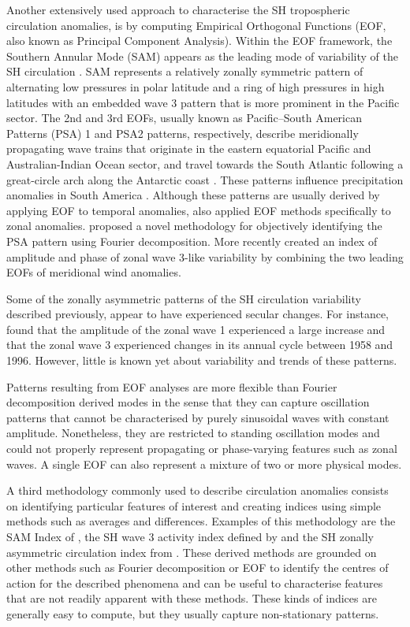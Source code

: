 \documentclass[pdflatex,sn-basic]{sn-jnl}
\theoremstyle{thmstyleone}%
\theoremstyle{thmstyletwo}%
\theoremstyle{thmstylethree}%
\begin{document}
Another extensively used approach to characterise the SH tropospheric circulation anomalies, is by computing Empirical Orthogonal Functions (EOF, also known as Principal Component Analysis).
Within the EOF framework, the Southern Annular Mode (SAM) appears as the leading mode of variability of the SH circulation \citep{fogt2020}.
SAM represents a relatively zonally symmetric pattern of alternating low pressures in polar latitude and a ring of high pressures in high latitudes with an embedded wave 3 pattern that is more prominent in the Pacific sector.
The 2nd and 3rd EOFs, usually known as Pacific--South American Patterns (PSA) 1 and PSA2 patterns, respectively, describe meridionally propagating wave trains that originate in the eastern equatorial Pacific and Australian-Indian Ocean sector, and travel towards the South Atlantic following a great-circle arch along the Antarctic coast \citep{mo2001}.
These patterns influence precipitation anomalies in South America \citep{mo2001}.
Although these patterns are usually derived by applying EOF to temporal anomalies, \citet{raphael2003} also applied EOF methods specifically to zonal anomalies.
\citet{irving2016} proposed a novel methodology for objectively identifying the PSA pattern using Fourier decomposition.
More recently \citet{goyal2022} created an index of amplitude and phase of zonal wave 3-like variability by combining the two leading EOFs of meridional wind anomalies.

Some of the zonally asymmetric patterns of the SH circulation variability described previously, appear to have experienced secular changes.
For instance, \citet{raphael2003} found that the amplitude of the zonal wave 1 experienced a large increase and that the zonal wave 3 experienced changes in its annual cycle between 1958 and 1996.
However, little is known yet about variability and trends of these patterns.

Patterns resulting from EOF analyses are more flexible than Fourier decomposition derived modes in the sense that they can capture oscillation patterns that cannot be characterised by purely sinusoidal waves with constant amplitude.
Nonetheless, they are restricted to standing oscillation modes and could not properly represent propagating or phase-varying features such as zonal waves.
A single EOF can also represent a mixture of two or more physical modes.

A third methodology commonly used to describe circulation anomalies consists on identifying particular features of interest and creating indices using simple methods such as averages and differences.
Examples of this methodology are the SAM Index of \citet{gong1999}, the SH wave 3 activity index defined by \citet{raphael2004} and the SH zonally asymmetric circulation index from \citet{hobbs2010}.
These derived methods are grounded on other methods such as Fourier decomposition or EOF to identify the centres of action for the described phenomena and can be useful to characterise features that are not readily apparent with these methods.
These kinds of indices are generally easy to compute, but they usually capture non-stationary patterns.
\end{document}
